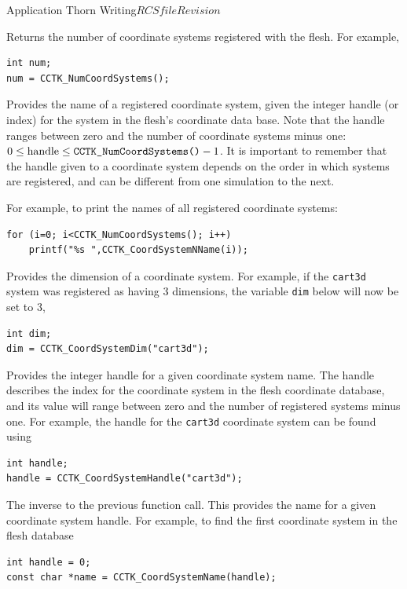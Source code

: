 \begin{cactuspart}{Application Thorn Writing}{$RCSfile$}{$Revision$}
\begin{Lentry}
Returns the number of coordinate systems registered with the flesh. For example,
%
\begin{verbatim}
int num;
num = CCTK_NumCoordSystems();
\end{verbatim}

\item[\texttt{CCTK\_CoordSystemName}]

Provides the name of a registered coordinate system, given the integer
handle (or index) for the system in the flesh's coordinate data base.
Note that the handle ranges between zero and the number of coordinate systems minus one: $0 \le \mbox{handle} \le \mbox{\texttt{CCTK\_NumCoordSystems()}}-1$.
It is important to remember that the handle given to a coordinate system
depends on the order in which systems are registered, and can be different
from one simulation to the next.

For example, to print the names of all registered coordinate systems:
%
\begin{verbatim}
for (i=0; i<CCTK_NumCoordSystems(); i++)
    printf("%s ",CCTK_CoordSystemNName(i));
\end{verbatim}

\item[\texttt{CCTK\_CoordSystemDim}]

Provides the dimension of a coordinate system. For example, if
the \texttt{cart3d} system was registered as having 3 dimensions, the
variable \texttt{dim} below will now be set to 3,
%
\begin{verbatim}
int dim;
dim = CCTK_CoordSystemDim("cart3d");
\end{verbatim}

\item[\texttt{CCTK\_CoordSystemHandle}]

Provides the integer handle for a given coordinate system name. The handle describes
the index for the coordinate system in the flesh coordinate database, and its value
will range between zero and the number of registered systems minus one. For example,
the handle for the \texttt{cart3d} coordinate system can be found using
%
\begin{verbatim}
int handle;
handle = CCTK_CoordSystemHandle("cart3d");
\end{verbatim}

\item[\texttt{CCTK\_CoordSystemName}]

The inverse to the previous function call. This provides the name for a given coordinate system handle.
For example, to find the first coordinate system in the flesh database
%
\begin{verbatim}
int handle = 0;
const char *name = CCTK_CoordSystemName(handle);
\end{verbatim}


\end{Lentry}
\end{cactuspart}
